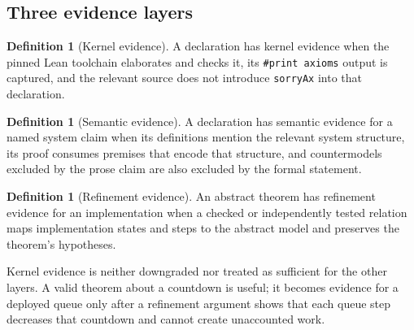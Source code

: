 \documentclass[10pt,letterpaper]{article}
\theoremstyle{definition}
\newtheorem{definition}[theorem]{Definition}
\begin{document}
\subsection{Three evidence layers}
\begin{definition}[Kernel evidence]
A declaration has kernel evidence when the pinned Lean toolchain elaborates and
checks it, its \texttt{\#print axioms} output is captured, and the relevant
source does not introduce \texttt{sorryAx} into that declaration.
\end{definition}

\begin{definition}[Semantic evidence]
A declaration has semantic evidence for a named system claim when its
definitions mention the relevant system structure, its proof consumes premises
that encode that structure, and countermodels excluded by the prose claim are
also excluded by the formal statement.
\end{definition}

\begin{definition}[Refinement evidence]
An abstract theorem has refinement evidence for an implementation when a
checked or independently tested relation maps implementation states and steps
to the abstract model and preserves the theorem's hypotheses.
\end{definition}

Kernel evidence is neither downgraded nor treated as sufficient for the other
layers. A valid theorem about a countdown is useful; it becomes evidence for a
deployed queue only after a refinement argument shows that each queue step
decreases that countdown and cannot create unaccounted work.
\end{document}

